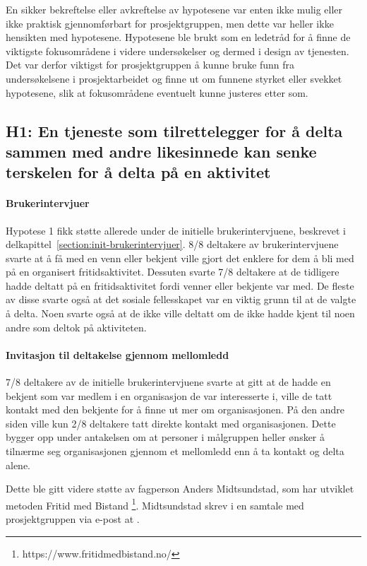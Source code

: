 En sikker bekreftelse eller avkreftelse av hypotesene var enten ikke mulig eller ikke praktisk gjennomførbart for prosjektgruppen, men dette var heller ikke hensikten med hypotesene. Hypotesene ble brukt som en ledetråd for å finne de viktigste fokusområdene i videre undersøkelser og dermed i design av tjenesten. Det var derfor viktigst for prosjektgruppen å kunne bruke funn fra undersøkelsene i prosjektarbeidet og finne ut om funnene styrket eller svekket hypotesene, slik at fokusområdene eventuelt kunne justeres etter som.

\subsection{H1: En tjeneste som tilrettelegger for å delta sammen med andre likesinnede kan senke terskelen for å delta på en aktivitet}

\paragraph{Brukerintervjuer}
Hypotese 1 fikk støtte allerede under de initielle brukerintervjuene, beskrevet i delkapittel~\ref{section:init-brukerintervjuer}. 8/8 deltakere av brukerintervjuene svarte at å få med en venn eller bekjent ville gjort det enklere for dem å bli med på en organisert fritidsaktivitet. Dessuten svarte 7/8 deltakere at de tidligere hadde deltatt på en fritidsaktivitet fordi venner eller bekjente var med. De fleste av disse svarte også at det sosiale fellesskapet var en viktig grunn til at de valgte å delta. Noen svarte også at de ikke ville deltatt om de ikke hadde kjent til noen andre som deltok på aktiviteten.

\paragraph{Invitasjon til deltakelse gjennom mellomledd}
7/8 deltakere av de initielle brukerintervjuene svarte at gitt at de hadde en bekjent som var medlem i en organisasjon de var interesserte i, ville de tatt kontakt med den bekjente for å finne ut mer om organisasjonen. På den andre siden ville kun 2/8 deltakere tatt direkte kontakt med organisasjonen. Dette bygger opp under antakelsen om at personer i målgruppen heller ønsker å tilnærme seg organisasjonen gjennom et mellomledd enn å ta kontakt og delta alene. 

Dette ble gitt videre støtte av fagperson Anders Midtsundstad, som har utviklet metoden Fritid med Bistand \footnote{https://www.fritidmedbistand.no/}. Midtsundstad skrev i en samtale med prosjektgruppen via e-post at  \cite{MIDTSUNDSTAD-EPOST:14}. 

